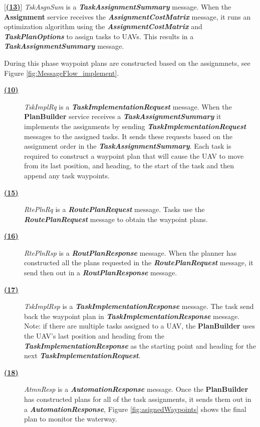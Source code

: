 \begin{description}
	\item\hyperlink{msg:13.TaskAssignmentSummary}{[\textbf{(13)}}]  \textit{TskAsgnSum} is a \textbf{\textit{TaskAssignmentSummary}} message. When the \textbf{Assignment} service receives the \textbf{\textit{AssignmentCostMatrix}} message, it runs an optimization algorithm using the \textbf{\textit{AssignmentCostMatrix}} and \textbf{\textit{TaskPlanOptions}} to assign tasks to UAVs. This results in a \textbf{\textit{TaskAssignmentSummary}} message.
\end{description}



During this phase waypoint plans are constructed based on the assignmnets, see Figure \ref{fig:MessageFlow_implement}.
\begin{description}
	\item[\hyperlink{msg:14.TaskImplementationRequest}{\textbf{(10)}}]  \textit{TskImplRq} is a \textbf{\textit{TaskImplementationRequest}} message. When the \textbf{PlanBuilder} service receives a \textbf{\textit{TaskAssignmentSummary}} it implements the assignments by sending \textbf{\textit{TaskImplementationRequest}} messages to the assigned tasks. It sends these requests based on the assignment order in the \textbf{\textit{TaskAssignmentSummary}}. Each task is required to construct a waypoint plan that will cause the UAV to move from its last position, and heading, to the start of the task and then append any task waypoints.
	\item[\hyperlink{msg:15.RoutePlanRequest.400}{\textbf{(15)}}]  \textit{RtePlnRq} is a \textbf{\textit{RoutePlanRequest}} message.  Tasks use the \textbf{\textit{RoutePlanRequest}} message to obtain the waypoint plans.
	\item[\hyperlink{msg:16.RoutePlanResponse.400}{\textbf{(16)}}]  \textit{RtePlnRsp} is a \textbf{\textit{RoutPlanResponse}} message. When the planner has constructed all the plans requested in the \textbf{\textit{RoutePlanRequest}} message, it send then out in a \textbf{\textit{RoutPlanResponse}} message.
	\item[\hyperlink{msg:17.TaskImplementationResponse}{\textbf{(17)}}]  \textit{TskImplRsp} is a \textbf{\textit{TaskImplementationResponse}} message. The task send back the waypoint plan in \textbf{\textit{TaskImplementationResponse}} message. Note: if there are multiple tasks assigned to a UAV, the \textbf{PlanBuilder} uses the UAV's last position and heading from the \textbf{\textit{TaskImplementationResponse}} as the starting point and heading for the next \textbf{\textit{TaskImplementationRequest}}.
	\item[\hyperlink{msg:18.AutomationResponse}{\textbf{(18)}}]  \textit{AtmnResp} is a \textbf{\textit{AutomationResponse}} message. Once the \textbf{PlanBuilder} has constructed plans for all of the task assignments, it sends them out in a \textbf{\textit{AutomationResponse}}, Figure \ref{fig:asignedWaypoints} shows the final plan to monitor the waterway.
\end{description}

